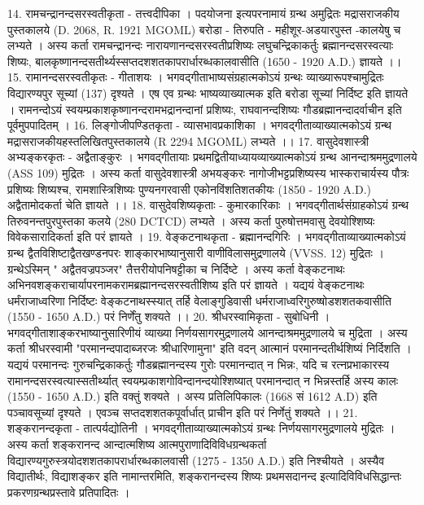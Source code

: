 14. रामचन्द्रानन्दसरस्वतीकृता - तत्त्वदीपिका ।
पदयोजना इत्यपरनामायं ग्रन्थ अमुद्रितः मद्रासराजकीय पुस्तकालये (D. 2068, R. 1921 MGOML) बरोडा - तिरुपति - महीशूर-अडयारपुस्त -कालयेषु च लभ्यते । अस्य कर्ता रामचन्द्रानन्दः नारायणानन्दसरस्वतीप्रशिष्यः लघुचन्द्रिकाकर्तुः ब्रह्मानन्दसरस्वत्याः  शिष्यः, बालकृष्णानन्दसतीर्थ्यस्सप्तदशशतकापरार्धारब्धकालवासीति (1650 - 1920 A.D.) ज्ञायते ।। 
15. रामानन्दसरस्वतीकृतः - गीताशयः ।
भगवद्गीताभाष्यसंग्रहात्मकोऽयं ग्रन्थः व्याख्यारूपश्चामुद्रितः विद्यारण्यपुर सूच्यां (137) दृश्यते । एष एव ग्रन्थः भाष्यव्याख्यात्मक इति बरोडा सूच्यां निर्दिष्ट इति ज्ञायते । रामनन्दोऽयं स्वयम्प्रकाशकृष्णानन्दरामभद्रानन्दानां प्रशिष्यः, राघवानन्दशिष्यः गौडब्रह्मानन्दादर्वाचीन इति पूर्वमुपपादितम् ।
16. लिङ्गोजीपण्डितकृता - व्यासभावप्रकाशिका । भगवद्गीताव्याख्यात्मकोऽयं ग्रन्थ मद्रासराजकीयहस्तलिखितपुस्तकालये (R 2294 MGOML) लभ्यते ।। 
17. वासुदेवशास्त्री अभ्यङ्करकृतः - अद्वैताङ्कुरः । भगवद्गीतायाः प्रथमद्वितीयाध्यायव्याख्यात्मकोऽयं ग्रन्थ आनन्दाश्रममुद्रणालये (ASS 109) मुद्रितः ।
अस्य कर्ता वासुदेवशास्त्री अभयङ्करः नागोजीभट्टप्रशिष्यस्य भास्कराचार्यस्य पौत्रः प्रशिष्यः शिष्यश्च, रामशास्त्रिशिष्यः पुण्यनगरवासी एकोनविंशतिशतकीयः (1850 - 1920 A.D.) अद्वैतामोदकर्ता चेति ज्ञायते ।। 
18. वासुदेवशिष्यकृताः - कुमारकारिकाः । भगवद्गीतार्थसंग्राहकोऽयं ग्रन्थ तिरुवनन्तपुरपुस्तका कलये (280 DCTCD) लभ्यते । अस्य कर्ता पुरुषोत्तमवासु देवयोश्शिष्यः विवेकसारादिकर्ता इति परं ज्ञायते ।
19. वेङ्कटनाथकृता - ब्रह्मानन्दगिरिः । 
भगवद्गीताव्याख्यात्मकोऽयं ग्रन्थ द्वैतविशिष्टाद्वैतखण्डनपरः शाङ्कारभाष्यानुसारी वाणीविलासमुद्रणालये (VVSS. 12) मुद्रितः । ग्रन्थेऽस्मिन् " अद्वैतवज्रपञ्जर" तैत्तरीयोपनिषट्टीका च निर्दिष्टे । अस्य कर्ता वेङ्कटनाथः अभिनवशङ्कराचार्यापरनामकरामब्रह्मानन्दसरस्वतीशिष्य इति परं ज्ञायते । यद्ययं वेङ्कटनाथः धर्मंराजाध्वरिणा निर्दिष्टः वेङ्कटनाथस्स्यात् तर्हि वेलाङ्गुडिवासी धर्मराजाध्वरिगुरुष्षोडशशतकवासीति (1550 - 1650 A.D.) परं निर्णेंतु शक्यते ।। 
20. श्रीधरस्वामिकृता - सुबोधिनी ।
भगवद्गीताशाङ्करभाष्यानुसारिणीयं व्याख्या निर्णयसागरमुद्रणालये आनन्दाश्रममुद्रणालये च मुद्रिता । अस्य कर्ता श्रीधरस्वामी "परमानन्दपादाब्जरजः श्रीधारिणामुना" इति वदन् आत्मानं परमानन्दतीर्थशिष्यं निर्दिशति । यद्ययं परमानन्दः गुरुचन्द्रिकाकर्तुः गौडब्रह्मानन्दस्य गुरोः परमानन्दात् न भिन्नः, यदि च रत्नप्रभाकारस्य रामानन्दसरस्वत्यास्सतीर्थ्यात् स्वयम्प्रकाशगोविन्दानन्दयोश्शिष्यात् परमानन्दात् न भिन्नस्तर्हि अस्य कालः (1550 - 1650 A.D.) इति वक्तुं शक्यते । अस्य प्रतिलिपिकालः (1668 सं 1612 A.D) इति पञ्चावसूच्यां दृश्यते । एवञ्च सप्तदशशतकपूर्वार्धात् प्राचीन इति परं निर्णेतुं शक्यते ।। 
21. शङ्करानन्दकृता - तात्पर्यद्योतिनी । 
भगवद्गीताव्याख्यात्मकोऽयं ग्रन्थः निर्णयसागरमुद्रणालये मुद्रितः । अस्य कर्ता शङ्करानन्द आन्दात्मशिष्य आत्मपुराणादिविविधग्रन्थकर्ता विद्यारण्यगुरुस्त्रयोदशशतकापरार्धारब्धकालवासी (1275 - 1350 A.D.) इति निश्चीयते । अस्यैव विद्यातीर्थः, विद्याशङ्कर इति नामान्तरमिति, शङ्करानन्दस्य शिष्यः प्रथमसदानन्द इत्यादिविविधसिद्धान्तः प्रकरणग्रन्थप्रस्तावे प्रतिपादितः । 
